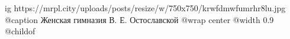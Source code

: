  
 
 
 
 

\ifcmt
  ig https://mrpl.city/uploads/posts/resize/w/750x750/krwfdmwfumrhr8lu.jpg
	@caption Женская гимназия В. Е. Остославской
  @wrap center
  @width 0.9
  @childof 
\fi
